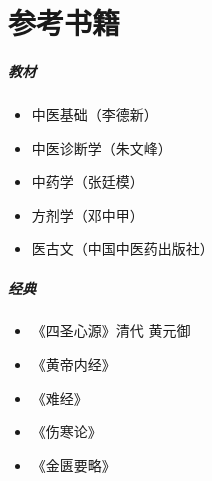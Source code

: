 \chapter{参考书籍}

\paragraph{教材}
\begin{itemize}
  \item 中医基础（李德新）
  \item 中医诊断学（朱文峰）
  \item 中药学（张廷模）
  \item 方剂学（邓中甲）
  \item 医古文（中国中医药出版社）
\end{itemize}

\paragraph{经典}
\begin{itemize}
  \item 《四圣心源》清代 黄元御
  \item 《黄帝内经》
  \item 《难经》
  \item 《伤寒论》
  \item 《金匮要略》
\end{itemize}
